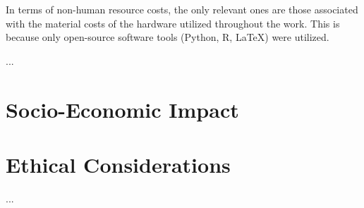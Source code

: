 \documentclass[../main.tex]{subfiles}
\begin{document}
In terms of non-human resource costs, the only relevant ones are those associated with the material costs of the hardware utilized throughout the work. This is because only open-source software tools (Python, R, LaTeX) were utilized.

...






\section*{Socio-Economic Impact} \label{impact}






\section*{Ethical Considerations}  \label{ethics}

...

\end{document}

